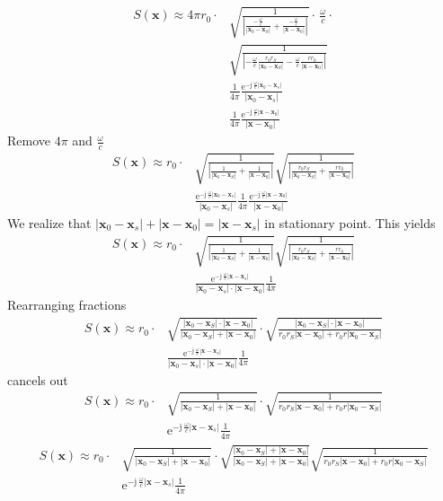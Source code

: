 \documentclass[a4paper,BCOR=15mm,10pt,twoside]{scrartcl}
\newcommand\e{\mathrm{e}}  %
\newcommand\im{\mathrm{j}}  %
\newcommand\wc{\frac{\omega}{c}}  %
\newcommand\jwc{\im\,\frac{\omega}{c}}  %
\renewcommand{\vec}[1]{\mathbf{#1}}  %
\begin{document}
\begin{align}
S(\vec{x}) \approx 4 \pi r_0 \cdot
&  
\sqrt{\frac{1}{|\frac{-\wc}{|\vec{x}_0-\vec{x}_S|}+\frac{-\wc}{|\vec{x}-\vec{x}_0|}|}} 
\cdot \, 
\wc
\cdot\nonumber\\
&
\sqrt{\frac{1}{|-\wc \frac{r_0 r_S}{|\vec{x}_0 -\vec{x}_S|}-\wc \frac{r r_0}{|\vec{x} -\vec{x}_0|}|}}\nonumber\\
&\frac{1}{4\pi} \frac{\e^{-\jwc |\vec{x}_0-\vec{x}_s|}}{|\vec{x}_0-\vec{x}_s|}\nonumber\\
&\frac{1}{4\pi} \frac{\e^{-\jwc |\vec{x}-\vec{x}_0|}}{|\vec{x}-\vec{x}_0|}
\end{align}
Remove $4\pi$ and $\wc$
\begin{align}
S(\vec{x}) \approx r_0 \cdot
&  
\sqrt{\frac{1}{|\frac{1}{|\vec{x}_0-\vec{x}_S|}+\frac{1}{|\vec{x}-\vec{x}_0|}|}} 
\sqrt{\frac{1}{|\frac{r_0 r_S}{|\vec{x}_0 -\vec{x}_S|}+\frac{r r_0}{|\vec{x} -\vec{x}_0|}|}}\nonumber\\
&\frac{\e^{-\jwc |\vec{x}_0-\vec{x}_s|}}{|\vec{x}_0-\vec{x}_s|}
\frac{1}{4\pi} \frac{\e^{-\jwc |\vec{x}-\vec{x}_0|}}{|\vec{x}-\vec{x}_0|}
\end{align}
We realize that $|\vec{x}_0-\vec{x}_s| + |\vec{x} -\vec{x}_0| = |\vec{x} -\vec{x}_s|$ in stationary point. This yields
\begin{align}
S(\vec{x}) \approx r_0 \cdot
&  
\sqrt{\frac{1}{|\frac{1}{|\vec{x}_0-\vec{x}_S|}+\frac{1}{|\vec{x}-\vec{x}_0|}|}} 
\sqrt{\frac{1}{|\frac{r_0 r_S}{|\vec{x}_0 -\vec{x}_S|}+\frac{r r_0}{|\vec{x} -\vec{x}_0|}|}}\nonumber\\
&\frac{\e^{-\jwc |\vec{x}-\vec{x}_s|}}{|\vec{x}_0-\vec{x}_s|\cdot |\vec{x}-\vec{x}_0|}
\frac{1}{4\pi} 
\end{align}
Rearranging fractions
\begin{align}
S(\vec{x}) \approx r_0 \cdot
&  
\sqrt{\frac{|\vec{x}_0-\vec{x}_S|\cdot |\vec{x}-\vec{x}_0|}{|\vec{x}_0-\vec{x}_S| + |\vec{x}-\vec{x}_0|}} \cdot
\sqrt{\frac{|\vec{x}_0-\vec{x}_S|\cdot |\vec{x}-\vec{x}_0|}{r_0 r_S |\vec{x} -\vec{x}_0| + r_0 r |\vec{x}_0-\vec{x}_S|}}
\nonumber\\
&\frac{\e^{-\jwc |\vec{x}-\vec{x}_s|}}{|\vec{x}_0-\vec{x}_s|\cdot |\vec{x}-\vec{x}_0|}
\frac{1}{4\pi} 
\end{align}
cancels out
\begin{align}
S(\vec{x}) \approx r_0 \cdot
&  
\sqrt{\frac{1}{|\vec{x}_0-\vec{x}_S| + |\vec{x}-\vec{x}_0|}} \cdot
\sqrt{\frac{1}{r_0 r_S |\vec{x} -\vec{x}_0| + r_0 r |\vec{x}_0-\vec{x}_S|}}
\nonumber\\
&\e^{-\jwc |\vec{x}-\vec{x}_s|}
\frac{1}{4\pi} 
\end{align}
\begin{align}
S(\vec{x}) \approx r_0 \cdot
&  
\sqrt{\frac{1}{|\vec{x}_0-\vec{x}_S| + |\vec{x}-\vec{x}_0|}} \cdot
\sqrt{\frac{|\vec{x}_0-\vec{x}_S| + |\vec{x}-\vec{x}_0|}{|\vec{x}_0-\vec{x}_S| + |\vec{x}-\vec{x}_0|}} 
\sqrt{\frac{1}{r_0 r_S |\vec{x} -\vec{x}_0| + r_0 r |\vec{x}_0-\vec{x}_S|}}
\nonumber\\
&\e^{-\jwc |\vec{x}-\vec{x}_s|}
\frac{1}{4\pi} 
\end{align}
\end{document}
